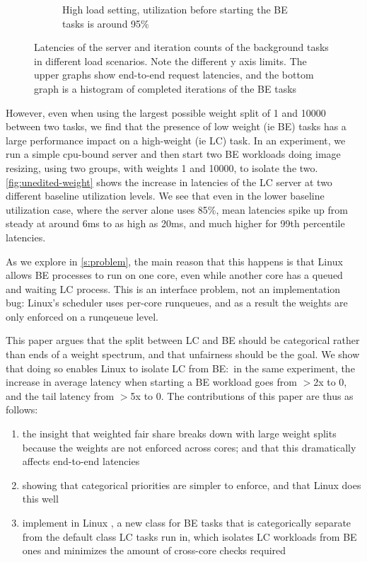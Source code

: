 \begin{figure}[t]
\begin{subfigure}[b]{0.49\columnwidth}
        \caption{High load setting, utilization before starting the BE tasks is
        around 95\%}\label{fig:unedited-weight-high-two}
    \end{subfigure}
    \vspace{4pt}
    \caption{Latencies of the server and iteration counts of the background
    tasks in different load scenarios. Note the different y axis limits. The
    upper graphs show end-to-end request latencies, and the bottom graph is a
    histogram of completed iterations of the BE tasks}\label{fig:unedited-weight}
\end{figure}

However, even when using the largest possible weight split of 1 and 10000
between two tasks, we find that the presence of low weight (ie BE) tasks has a
large performance impact on a high-weight (ie LC) task. In an experiment, we run
a simple cpu-bound server and then start two BE workloads doing image resizing,
using two \cgroups{} groups, with weights 1 and 10000, to isolate the two.
\autoref{fig:unedited-weight} shows the increase in latencies of the LC server
at two different baseline utilization levels. We see that even in the lower
baseline utilization case, where the server alone uses 85\%, mean latencies
spike up from steady at around 6ms to as high as 20ms, and much higher for 99th
percentile latencies.

As we explore in \autoref{s:problem}, the main reason that this happens is that
Linux allows BE processes to run on one core, even while another core has a
queued and waiting LC process. This is an interface problem, not an
implementation bug: Linux's scheduler uses per-core runqueues, and as a result
the weights are only enforced on a runqeueue level.

This paper argues that the split between LC and BE should be categorical rather
than ends of a weight spectrum, and that unfairness should be the goal. We show
that doing so enables Linux to isolate LC from BE:\ in the same experiment, the
increase in average latency when starting a BE workload goes from $>$2x to 0,
and the tail latency from $>$5x to 0. The contributions of this paper are thus
as follows: 
\begin{enumerate}
    \item the insight that weighted fair share breaks down with large weight
    splits because the weights are not enforced across cores; and that this
    dramatically affects end-to-end latencies
    \item showing that categorical priorities are simpler to enforce, and that
    Linux does this well
    \item implement in Linux \schedbe{}, a new class for BE tasks that is
    categorically separate from the default class LC tasks run in, which
    isolates LC workloads from BE ones and minimizes the amount of cross-core
    checks required
\end{enumerate}

